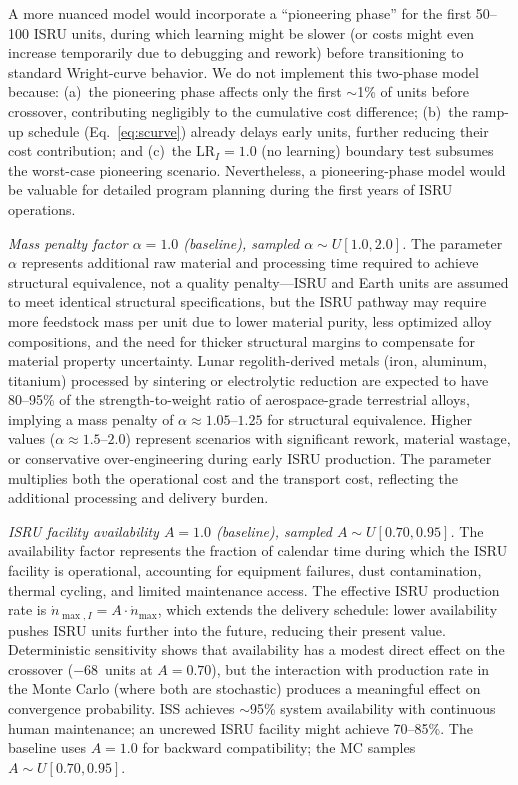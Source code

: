 \documentclass[preprint,12pt]{elsarticle}
\begin{document}
A more nuanced model would incorporate a ``pioneering phase'' for the first 50--100 ISRU units, during which learning might be slower (or costs might even increase temporarily due to debugging and rework) before transitioning to standard Wright-curve behavior. We do not implement this two-phase model because: (a)~the pioneering phase affects only the first $\sim$1\% of units before crossover, contributing negligibly to the cumulative cost difference; (b)~the ramp-up schedule (Eq.~\ref{eq:scurve}) already delays early units, further reducing their cost contribution; and (c)~the $\mathrm{LR}_I = 1.0$ (no learning) boundary test subsumes the worst-case pioneering scenario. Nevertheless, a pioneering-phase model would be valuable for detailed program planning during the first years of ISRU operations.

\emph{Mass penalty factor $\alpha = 1.0$ (baseline), sampled $\alpha \sim U[1.0, 2.0]$.} The parameter $\alpha$ represents additional raw material and processing time required to achieve structural equivalence, not a quality penalty---ISRU and Earth units are assumed to meet identical structural specifications, but the ISRU pathway may require more feedstock mass per unit due to lower material purity, less optimized alloy compositions, and the need for thicker structural margins to compensate for material property uncertainty. Lunar regolith-derived metals (iron, aluminum, titanium) processed by sintering or electrolytic reduction are expected to have 80--95\% of the strength-to-weight ratio of aerospace-grade terrestrial alloys, implying a mass penalty of $\alpha \approx 1.05$--$1.25$ for structural equivalence. Higher values ($\alpha \approx 1.5$--$2.0$) represent scenarios with significant rework, material wastage, or conservative over-engineering during early ISRU production. The parameter multiplies both the operational cost and the transport cost, reflecting the additional processing and delivery burden.

\emph{ISRU facility availability $A = 1.0$ (baseline), sampled $A \sim U[0.70, 0.95]$.} The availability factor represents the fraction of calendar time during which the ISRU facility is operational, accounting for equipment failures, dust contamination, thermal cycling, and limited maintenance access. The effective ISRU production rate is $\dot{n}_{\max,I} = A \cdot \dot{n}_{\max}$, which extends the delivery schedule: lower availability pushes ISRU units further into the future, reducing their present value. Deterministic sensitivity shows that availability has a modest direct effect on the crossover ($-$68~units at $A = 0.70$), but the interaction with production rate in the Monte Carlo (where both are stochastic) produces a meaningful effect on convergence probability. ISS achieves $\sim$95\% system availability with continuous human maintenance; an uncrewed ISRU facility might achieve 70--85\%. The baseline uses $A = 1.0$ for backward compatibility; the MC samples $A \sim U[0.70, 0.95]$.
\end{document}
